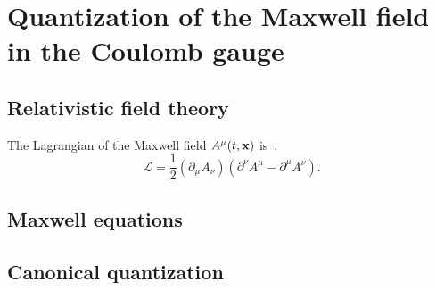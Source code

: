 \section{Quantization of the Maxwell field in the Coulomb gauge}

\subsection{Relativistic field theory}

The Lagrangian of the Maxwell field $A^\mu(t,\vb{x})$ is~\cite[p.~339]{Srednicki2007}.
\begin{equation}
	\mathcal{L}
	=
	\frac{1}{2}
	(\partial_\mu A_\nu)
	\left(
		\partial^\nu A^\mu
		-
		\partial^\mu A^\nu
	\right)
	.
\end{equation}

\subsection{Maxwell equations}

\subsection{Canonical quantization}